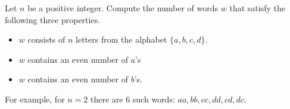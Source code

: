 Let \(n\) be a positive integer. Compute the number of words \(w\) that satisfy the following three properties.
\begin{itemize}
    \item[i.] \(w\) consists of \(n\) letters from the alphabet \(\{a,b,c,d\}.\)
    \item[ii.] \(w\) contains an even number of \(a\)'s
    \item[iii.] \(w\) contains an even number of \(b\)'s.
\end{itemize}
For example, for \(n=2\) there are \(6\) such words: \(aa, bb, cc, dd, cd, dc.\)